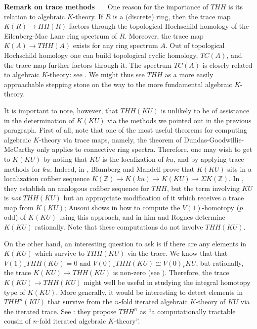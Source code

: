 \documentclass[a4paper,11pt]{amsart} %
\theoremstyle{definition} \newtheorem{defn}[equation]{Definition}
\theoremstyle{remark} \newtheorem{notation}[equation]{Notation}
\theoremstyle{plain} \newtheorem{teo}[equation]{Theorem}
\theoremstyle{plain} \newtheorem{lema}[equation]{Lemma}
\theoremstyle{plain} \newtheorem{prop}[equation]{Proposition}
\theoremstyle{plain} \newtheorem{corolario}[equation]{Corollary}
\theoremstyle{remark} \newtheorem{obs}[equation]{Remark}
\theoremstyle{remark} \newtheorem{sideobs}[equation]{Side remark}
\theoremstyle{remark} \newtheorem{ejercicio}[equation]{Exercise}
\theoremstyle{definition} \newtheorem{notn}[equation]{Notation}
\theoremstyle{remark} \newtheorem{ej}[equation]{Example}
\theoremstyle{remark} \newtheorem{contraej}[equation]{Counterexample}
\theoremstyle{plain} \newtheorem{conj}[equation]{Conjecture}
\newcommand{\paragrafo}[1]{\textbf{#1}\ \ \ }
\renewcommand{\1}{\ensuremath{\mathbbm{1}}}
\newcommand{\Z}{\mathbb{Z}}
\numberwithin{equation}{section}
\begin{document}
\paragrafo{Remark on trace methods} One reason for the importance of $THH$ is its relation to algebraic $K$-theory. If $R$ is a (discrete) ring, then the trace map $K(R)\to HH(R)$ factors through the topological Hochschild homology of the Eilenberg-Mac Lane ring spectrum of $R$. Moreover, the trace map $K(A)\to THH(A)$ exists for any ring spectrum $A$. Out of topological Hochschild homology one can build topological cyclic homology, $TC(A)$, and the trace map further factors through it. The spectrum $TC(A)$ is closely related to algebraic $K$-theory: see \cite{dgm}. We might thus see $THH$ as a more easily approachable stepping stone on the way to the more fundamental algebraic $K$-theory.

It is important to note, however, that $THH(KU)$ is unlikely to be of assistance in the determination of $K(KU)$ via the methods we pointed out in the previous paragraph. First of all, note that one of the most useful theorems for computing algebraic $K$-theory via trace maps, namely, the theorem of Dundas-Goodwillie-McCarthy \cite[7.0.0.2]{dgm} only applies to connective ring spectra. Therefore, one may wish to get to $K(KU)$ by noting that $KU$ is the localization of $ku$, and by applying trace methods for $ku$. Indeed, in \cite{bm-localization-08}, Blumberg and Mandell prove that $K(KU)$ sits in a localization cofiber sequence $K(\Z)\to K(ku)\to K(KU)\to \Sigma K(\Z)$. In \cite{bm-localization-14}, they establish an analogous cofiber sequence for $THH$, but the term involving $KU$ is \emph{not} $THH(KU)$ but an appropriate modification of it which receives a trace map from $K(KU)$; Ausoni shows in \cite[8.3]{ausoni-2010} how to compute the $V(1)$-homotopy ($p$ odd) of $K(KU)$ using this approach, and in \cite[3.6]{ausoni-rognes-rational} him and Rognes determine $K(KU)$ rationally. Note that these computations do not involve $THH(KU)$. 

%
%

On the other hand, an interesting question to ask is if there are any elements in $K(KU)$ which survive to $THH(KU)$ via the trace. 
We know that that $V(1)_*THH(KU)=0$ and $V(0)_*THH(KU)\cong V(0)_*KU$, but rationally, the trace $K(KU)\to THH(KU)$ is non-zero (see \cite[Paragraph 5.3]{ausoni-rognes-rational}). Therefore, the trace $K(KU)\to THH(KU)$ might well be useful in studying the integral homotopy type of $K(KU)$. 
%
More generally, it would be interesting to detect elements in $THH^n(KU)$ that survive from the $n$-fold iterated algebraic $K$-theory of $KU$ via the iterated trace. See \cite{cdd}: they propose $THH^n$ as ``a computationally tractable cousin of $n$-fold iterated algebraic $K$-theory''.\\
\end{document}
